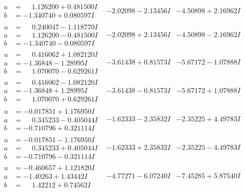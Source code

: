 \documentclass[1p]{elsarticle_modified}
\theoremstyle{definition}
\begin{document}
$$\begin{array}{c|c|c}
\begin{aligned}
a &= \phantom{-}1.126200 + 0.481500 I \\
b &= -1.340740 + 0.080597 I\end{aligned}
 & -2.02098 - 2.13456 I & -4.50898 + 2.16962 I \\ \hline\begin{aligned}
u &= \phantom{-}0.240047 - 1.118770 I \\
a &= \phantom{-}1.126200 - 0.481500 I \\
b &= -1.340740 - 0.080597 I\end{aligned}
 & -2.02098 + 2.13456 I & -4.50898 - 2.16962 I \\ \hline\begin{aligned}
u &= \phantom{-}0.416062 + 1.082120 I \\
a &= -1.36848 - 1.28995 I \\
b &= \phantom{-}1.070070 - 0.629261 I\end{aligned}
 & -3.61438 + 0.81573 I & -5.67172 - 1.07888 I \\ \hline\begin{aligned}
u &= \phantom{-}0.416062 - 1.082120 I \\
a &= -1.36848 + 1.28995 I \\
b &= \phantom{-}1.070070 + 0.629261 I\end{aligned}
 & -3.61438 - 0.81573 I & -5.67172 + 1.07888 I \\ \hline\begin{aligned}
u &= -0.017851 + 1.176950 I \\
a &= \phantom{-}0.345233 - 0.405044 I \\
b &= -0.710796 + 0.321114 I\end{aligned}
 & -1.62333 - 2.35832 I & -2.35225 + 4.49783 I \\ \hline\begin{aligned}
u &= -0.017851 - 1.176950 I \\
a &= \phantom{-}0.345233 + 0.405044 I \\
b &= -0.710796 - 0.321114 I\end{aligned}
 & -1.62333 + 2.35832 I & -2.35225 - 4.49783 I \\ \hline\begin{aligned}
u &= -0.460657 + 1.121820 I \\
a &= -1.40263 + 1.43442 I \\
b &= \phantom{-}1.42212 + 0.74562 I\end{aligned}
 & -4.77271 - 6.07240 I & -7.45285 + 5.87540 I \\ \hline\begin{aligned}

\end{aligned}
\end{array}$$
\end{document}
